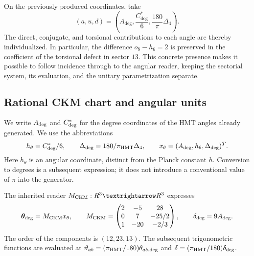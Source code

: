 On the previously produced coordinates, take
\[
 (a,u,d)=\left(A_{\deg},\frac{C^*_{\deg}}6,
                       \frac{180}{\pi}\Delta_4\right).
\]
The direct, conjugate, and torsional contributions to each angle
are thereby individualized. In particular, the difference
\(o_8-h_6=2\) is preserved in the coefficient of the torsional
defect in sector \(13\). This concrete presence makes it possible to follow
incidence through to the angular reader, keeping the sectorial
system, its evaluation, and the unitary parametrization separate.



\subsection{Rational CKM chart and angular units}

We write \(A_{\rm deg}\) and \(C^*_{\rm deg}\) for the degree coordinates of the HMT angles already generated. We use the abbreviations
\begin{equation}
 h_\theta=\frac{C^*_{\rm deg}}6,
 \qquad
 \Delta_{\rm deg}=\frac{180}{\pi_{\rm HMT}}\Delta_4,
 \qquad
 x_\theta=(A_{\rm deg},h_\theta,\Delta_{\rm deg})^{\mathsf T}.
 \label{ii:eq:ii-angular-chart}
\end{equation}
Here \(h_\theta\) is an angular coordinate, distinct from the Planck constant \(h\). Conversion to degrees is a subsequent expression; it does not introduce a conventional value of \(\pi\) into the generator.

\begin{definition}
The inherited reader \(\mathsf M_{\rm CKM}:\mathbb R^3\to\mathbb R^3\) expresses
\begin{equation}
 \boldsymbol\theta_{\rm deg}=\mathsf M_{\rm CKM}x_\theta,
 \qquad
 \mathsf M_{\rm CKM}=
 \begin{pmatrix}
 2&-5&28\\
 0&7&-25/2\\
 1&-20&-2/3
 \end{pmatrix},
 \qquad
 \delta_{\rm deg}=9A_{\rm deg}.
 \label{ii:eq:ii-ckm-map}
\end{equation}
The order of the components is \((12,23,13)\). The subsequent trigonometric functions are evaluated at \(\vartheta_{ab}=(\pi_{\rm HMT}/180)\theta_{ab,\rm deg}\) and \(\delta=(\pi_{\rm HMT}/180)\delta_{\rm deg}\).
\end{definition}

